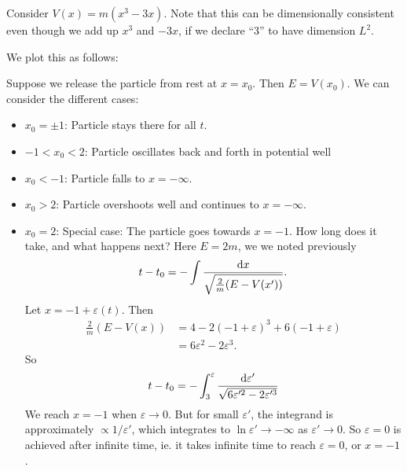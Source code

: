 \documentclass[a4paper]{article}
\begin{document}
\begin{eg}
  Consider $V(x) = m(x^3 - 3x)$. Note that this can be dimensionally consistent even though we add up $x^3$ and $-3x$, if we declare ``3'' to have dimension $L^2$.

  We plot this as follows:
  \begin{center}
  \end{center}

  Suppose we release the particle from rest at $x = x_0$. Then $E = V(x_0)$. We can consider the different cases:
  \begin{itemize}
    \item $x_0 = \pm 1$: Particle stays there for all $t$.
    \item $-1 < x_0 < 2$: Particle oscillates back and forth in potential well
    \item $x_0 < -1$: Particle falls to $x = -\infty$.
    \item $x_0 > 2$: Particle overshoots well and continues to $x = -\infty$.
    \item $x_0 = 2$: Special case: The particle goes towards $x = -1$. How long does it take, and what happens next? Here $E = 2m$, we we noted previously
      \[
        t - t_0 = -\int \frac{\mathrm{d} x}{\sqrt{\frac{2}{m}(E - V(x'))}}.
      \]
      Let $x = -1 + \varepsilon(t)$. Then
      \begin{align*}
        \frac{2}{m}(E-V(x)) &= 4 - 2(-1 + \varepsilon)^3 + 6(-1 + \varepsilon)\\
        &= 6\varepsilon^2 - 2\varepsilon^3.
      \end{align*}
      So
      \[
        t - t_0 = -\int_3^\varepsilon \frac{\mathrm{d} \varepsilon'}{\sqrt{6\varepsilon'^2 - 2\varepsilon'^3}}
      \]
      We reach $x = -1$ when $\varepsilon \to 0$. But for small $\varepsilon'$, the integrand is approximately $\propto 1/\varepsilon'$, which integrates to $\ln \varepsilon' \to -\infty$ as $\varepsilon' \to 0$. So $\varepsilon = 0$ is achieved after infinite time, ie. it takes infinite time to reach $\varepsilon = 0$, or $x = -1$.
  \end{itemize}
\end{eg}
\end{document}
